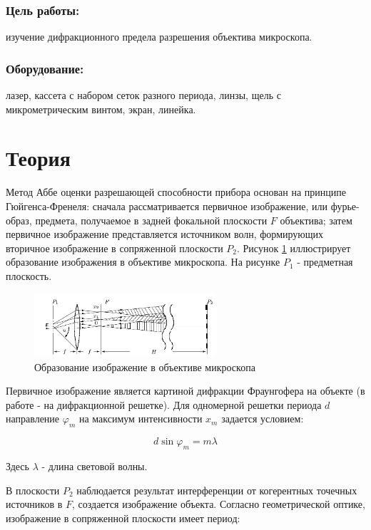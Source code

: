 \documentclass[a4paper,12pt]{article}
\begin{document}
\subsubsection*{Цель работы:}изучение дифракционного предела разрешения объектива микроскопа. 

\subsubsection*{Оборудование:} лазер, кассета с набором сеток разного периода, линзы, щель с микрометрическим винтом, экран, линейка. 

\section*{Теория}

Метод Аббе оценки разрешающей способности прибора основан на принципе Гюйгенса-Френеля: сначала рассматривается первичное изображение, или фурье-образ, предмета, получаемое в задней фокальной плоскости $F$ объектива; затем первичное изображение представляется источником волн, формирующих вторичное изображение в сопряженной плоскости $P_2$. Рисунок \ref{abbe} иллюстрирует образование изображения в объективе микроскопа. На рисунке $P_1$ - предметная плоскость. 

\begin{figure}[h]
	\centering	
	\includegraphics[width=0.6\textwidth]{abbe.png}
	\caption{Образование изображение в объективе микроскопа}
	\label{abbe}
\end{figure}

Первичное изображение является картиной дифракции Фраунгофера на объекте (в работе - на дифракционной решетке). Для одномерной решетки периода $d$ направление $\varphi_m$ на максимум интенсивности $x_m$ задается условием: 

\begin{equation}
d\sin\varphi_m = m\lambda
\label{eq1}
\end{equation}

Здесь $\lambda$ - длина световой волны. 

В плоскости $P_2$ наблюдается результат интерференции от когерентных точечных источников в $F$, создается изображение объекта. Согласно геометрической оптике, изображение в сопряженной плоскости имеет период: 
\end{document}
